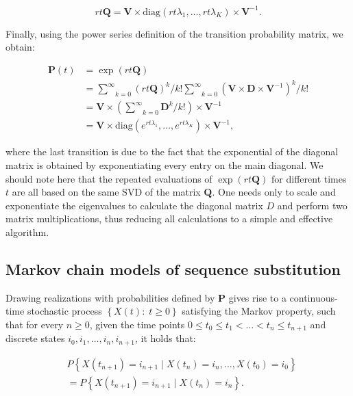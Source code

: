 \begin{equation}
rt\mathbf{Q}=\mathbf{V}\times\text{diag}(rt\lambda_{1},\ldots,rt\lambda_{K})\times\mathbf{V}^{-1} .
\end{equation}

\noindent Finally, using the power series definition of the transition probability matrix, we obtain: 

\begin{align}
\mathbf{P}(t) & =  \exp\left(rt\mathbf{Q}\right) \nonumber \\
& =   \underset{k=0}{\overset{\infty}{\sum}}\left(rt\mathbf{Q}\right)^{k}/k! \underset{k=0}{\overset{\infty}{\sum}}\left(\mathbf{V}\times\mathbf{D}\times\mathbf{V}^{-1}\right)^{k}/k! \nonumber \\
& =  \mathbf{V}\times\left(\underset{k=0}{\overset{\infty}{\sum}}\mathbf{D}^{k}/k!\right)\times\mathbf{V}^{-1} \nonumber \\
& =  \mathbf{V}\times\text{diag}(e^{rt\lambda_{1}},\ldots,e^{rt\lambda_{K}})\times\mathbf{V}^{-1} ,
\label{eq:eigen_decomposition}
\end{align}

\noindent 
where the last transition is due to the fact that the exponential of the diagonal matrix is obtained by exponentiating every entry on the main diagonal.
We should note here that the repeated evaluations of $\exp\left(rt\mathbf{Q}\right)$ for different times $t$ are all based on the same SVD of the matrix $\mathbf{Q}$. 
One needs only to scale and exponentiate the eigenvalues to calculate the diagonal matrix $D$ and perform two matrix multiplications, thus reducing all calculations to a simple and effective algorithm. 

\subsection{Markov chain models of sequence substitution\label{sub:subst_models}}

Drawing realizations with probabilities defined by $\mathbf{P}$  gives rise to a continuous-time stochastic process $\left\{ X(t):\; t\geq0\right\}$ satisfying the Markov property, such that for every $n\geq 0$, given the time points $0\leq t_{0}\leq t_{1}<\ldots<t_{n}\leq t_{n+1}$ and discrete states $i_{0},i_{1}, \ldots, i_{n},i_{n+1}$, it holds that: 

\begin{align}
& P\left\{ X(t_{n+1}) = i_{n+1}\mid X(t_{n})=i_{n},\ldots, X(t_{0})=i_{0}\right\}   \nonumber \\
&= P\left\{ X(t_{n+1}) = i_{n+1}\mid X(t_{n})=i_{n}\right\} .
\label{eq:markov}
\end{align}

